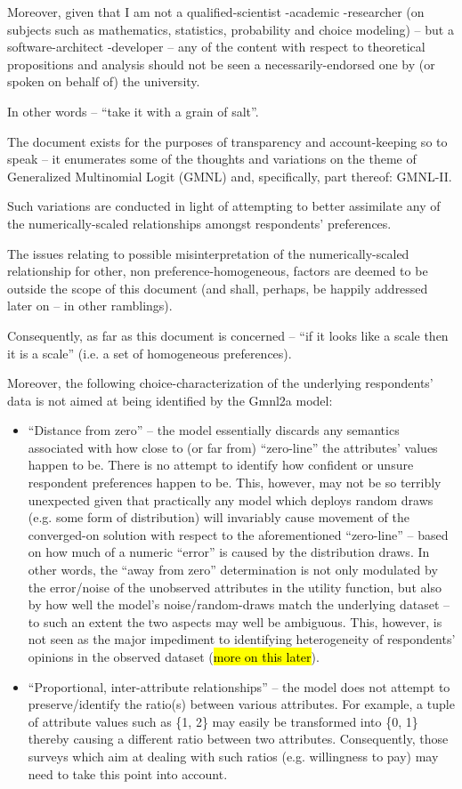 \documentclass[12pt,a4paper]{article}
\begin{document}
Moreover, given that I am not a qualified-scientist -academic -researcher (on subjects such as mathematics, statistics, probability and choice modeling) -- but a software-architect -developer -- any of the content with respect to theoretical propositions and analysis should not be seen a necessarily-endorsed one by (or spoken on behalf of) the university. 

In other words -- ``take it with a grain of salt''.

The document exists for the purposes of transparency and account-keeping so to speak -- it enumerates some of the thoughts and variations on the theme of Generalized Multinomial Logit (GMNL) and, specifically, part thereof: GMNL-II. 

Such variations are conducted in light of attempting to better assimilate any of the numerically-scaled relationships amongst respondents' preferences.

The issues relating to possible misinterpretation of the numerically-scaled relationship for other, non preference-homogeneous, factors are deemed to be outside the scope of this document (and shall, perhaps, be happily addressed later on -- in other ramblings). 

Consequently, as far as this document is concerned -- ``if it looks like a scale then it is a scale'' (i.e. a set of homogeneous preferences).

Moreover, the following choice-characterization of the underlying respondents' data is not aimed at being identified by the Gmnl2a model:
\begin{itemize}
\item ``Distance from zero'' -- the model essentially discards any semantics associated with how close to (or far from) ``zero-line'' the attributes' values happen to be. There is no attempt to identify how confident or unsure respondent preferences happen to be. This, however, may not be so terribly unexpected given that practically any model which deploys random draws (e.g. some form of distribution) will invariably cause movement of the converged-on solution with respect to the aforementioned ``zero-line'' -- based on how much of a numeric ``error'' is caused by the distribution draws. In other words, the ``away from zero'' determination is not only modulated by the error/noise of the unobserved attributes in the utility function, but also by how well the model's noise/random-draws match the underlying dataset -- to such an extent the two aspects may well be ambiguous. This, however, is not seen as the major impediment to identifying heterogeneity of respondents' opinions in the observed dataset (\hl{more on this later}).
\item ``Proportional, inter-attribute relationships'' -- the model does not attempt to preserve/identify the ratio(s) between various attributes. For example, a tuple of attribute values such as \{1, 2\} may easily be transformed into \{0, 1\} thereby causing a different ratio between two attributes. Consequently, those surveys which aim at dealing with such ratios (e.g. willingness to pay) may need to take this point into account. 
\end{itemize}
\end{document}
